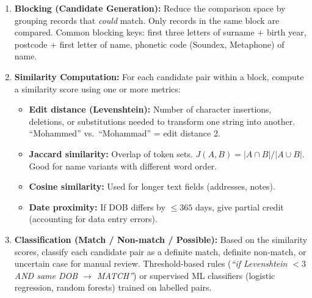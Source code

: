 \documentclass[12pt,a4paper]{article}
\begin{document}
\begin{enumerate}[leftmargin=2em, itemsep=8pt]
  \item \textbf{Blocking (Candidate Generation):}  Reduce the comparison space by grouping records that \textit{could} match.  Only records in the same block are compared.  Common blocking keys: first three letters of surname + birth year, postcode + first letter of name, phonetic code (Soundex, Metaphone) of name.

  \item \textbf{Similarity Computation:}  For each candidate pair within a block, compute a similarity score using one or more metrics:
    \begin{itemize}[leftmargin=1.5em, nosep]
      \item \textbf{Edit distance (Levenshtein):} Number of character insertions, deletions, or substitutions needed to transform one string into another.  ``Mohammed'' vs.\ ``Mohammad'' = edit distance 2.
      \item \textbf{Jaccard similarity:} Overlap of token sets.  $J(A, B) = |A \cap B| / |A \cup B|$.  Good for name variants with different word order.
      \item \textbf{Cosine similarity:} Used for longer text fields (addresses, notes).
      \item \textbf{Date proximity:} If DOB differs by $\leq 365$ days, give partial credit (accounting for data entry errors).
    \end{itemize}

  \item \textbf{Classification (Match / Non-match / Possible):}  Based on the similarity scores, classify each candidate pair as a definite match, definite non-match, or uncertain case for manual review.  Threshold-based rules (\textit{``if Levenshtein $<3$ AND same DOB $\to$ MATCH''}) or supervised ML classifiers (logistic regression, random forests) trained on labelled pairs.
\end{enumerate}
\end{document}

